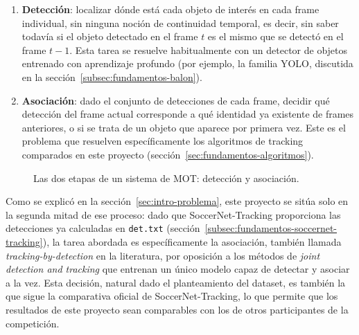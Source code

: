\begin{enumerate}
  \item \textbf{Detección}: localizar dónde está cada objeto de interés en
        cada frame individual, sin ninguna noción de continuidad temporal,
        es decir, sin saber todavía si el objeto detectado en el frame
        $t$ es el mismo que se detectó en el frame $t-1$. Esta tarea se
        resuelve habitualmente con un detector de objetos entrenado con
        aprendizaje profundo (por ejemplo, la familia YOLO, discutida en la
        sección~\ref{subsec:fundamentos-balon}).
  \item \textbf{Asociación}: dado el conjunto de detecciones de cada frame,
        decidir qué detección del frame actual corresponde a qué identidad
        ya existente de frames anteriores, o si se trata de un objeto que
        aparece por primera vez. Este es el problema que resuelven
        específicamente los algoritmos de tracking comparados en este
        proyecto (sección~\ref{sec:fundamentos-algoritmos}).
\end{enumerate}

\begin{figure}[htp]
\centering
{}
\caption{Las dos etapas de un sistema de MOT: detección y asociación.}
\label{fig:fundamentos-mot-pipeline}
\end{figure}

Como se explicó en la sección~\ref{sec:intro-problema}, este proyecto se
sitúa solo en la segunda mitad de ese proceso: dado que
SoccerNet-Tracking proporciona las detecciones ya calculadas en
\texttt{det.txt} (sección~\ref{subsec:fundamentos-soccernet-tracking}), la
tarea abordada es específicamente la asociación, también llamada
\emph{tracking-by-detection} en la literatura, por oposición a los métodos
de \emph{joint detection and tracking} que entrenan un único modelo capaz
de detectar y asociar a la vez. Esta decisión, natural dado el
planteamiento del dataset, es también la que sigue la comparativa oficial
de SoccerNet-Tracking, lo que permite que los resultados de este proyecto
sean comparables con los de otros participantes de la competición.

